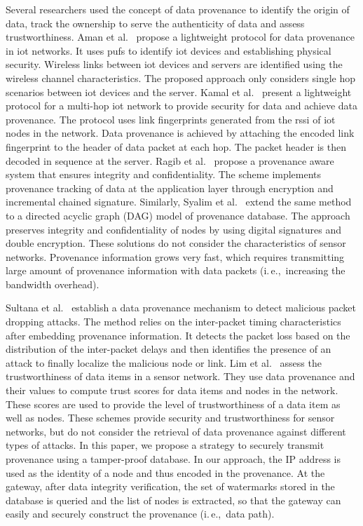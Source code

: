 \documentclass{llncs}
\newcommand{\ie}{i.\,e.,~}
\begin{document}
Several researchers used the concept of data provenance to identify the origin of data, track the ownership to serve the authenticity of data and assess trustworthiness. Aman et al.~\cite{Aman2017} propose a lightweight protocol for data provenance in \gls*{iot} networks. It uses \gls*{pufs} to identify \gls*{iot} devices and establishing physical security. Wireless links between \gls*{iot} devices and  servers are identified using the wireless channel characteristics. The proposed approach only considers single hop scenarios between \gls*{iot} devices and the server. Kamal et al.~\cite{Kamal2018} present a lightweight protocol for a multi-hop \gls*{iot} network to provide security for data and achieve data provenance. The protocol uses link fingerprints generated from the \gls*{rssi} of \gls*{iot} nodes in the network. Data provenance is achieved by attaching the encoded link fingerprint to the header of data packet at each hop. The packet header is then decoded in sequence at the server. Ragib et al.~\cite{Hasan2009} propose a provenance aware system that ensures integrity and confidentiality. The scheme implements provenance tracking of data at the application layer through encryption and incremental chained signature. Similarly, Syalim et al.~\cite{syalim2010} extend the same method to a directed acyclic graph (DAG) model of provenance database. The approach preserves integrity and confidentiality of nodes by using digital signatures and double encryption. These solutions do not consider the characteristics of sensor networks. Provenance information grows very fast, which requires transmitting large amount of provenance information with data packets (\ie increasing the bandwidth overhead).  

Sultana et al.~\cite{Sultana2011} establish a data provenance mechanism to detect malicious packet dropping attacks. The method relies on the inter-packet timing characteristics after embedding provenance information. It detects the packet loss based on the distribution of the inter-packet delays and then identifies the presence of an attack to finally localize the malicious node or link. Lim et al.~\cite{Lim2010} assess the trustworthiness of data items in a sensor network. They use data provenance and their values to compute trust scores for data items and nodes in the network. These scores are used to provide the level of trustworthiness of a data item as well as nodes. These schemes provide security and trustworthiness for sensor networks, but do not consider the retrieval of data provenance against different types of attacks. In this paper, we propose a strategy to securely transmit provenance using a tamper-proof database. In our approach, the IP address is used as the identity of a node and thus encoded in the provenance. At the gateway, after data integrity verification, the set of watermarks stored in the database is queried and the list of nodes is extracted, so that the gateway can easily and securely construct the provenance (\ie data path).
\end{document}
